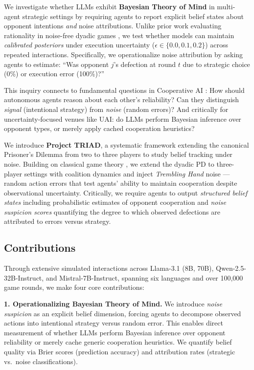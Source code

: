 \documentclass{uai2026} %
\begin{document}
We investigate whether LLMs exhibit \textbf{Bayesian Theory of Mind} in multi-agent strategic settings by requiring agents to report explicit belief states about opponent intentions \textit{and} noise attributions. Unlike prior work evaluating rationality in noise-free dyadic games \citep{akata2023playing,horton2023large}, we test whether models can maintain \textit{calibrated posteriors} under execution uncertainty ($\epsilon \in \{0.0, 0.1, 0.2\}$) across repeated interactions. Specifically, we operationalize noise attribution by asking agents to estimate: ``Was opponent $j$'s defection at round $t$ due to strategic choice (0\%) or execution error (100\%)?''

This inquiry connects to fundamental questions in Cooperative AI \citep{dafoe2020open}: How should autonomous agents reason about each other's reliability? Can they distinguish \textit{signal} (intentional strategy) from \textit{noise} (random errors)? And critically for uncertainty-focused venues like UAI: do LLMs perform Bayesian inference over opponent types, or merely apply cached cooperation heuristics?

We introduce \textbf{Project TRIAD}, a systematic framework extending the canonical Prisoner's Dilemma from two to three players to study belief tracking under noise. Building on classical game theory \citep{neumann1944theory,axelrod1981evolution}, we extend the dyadic PD to three-player settings with coalition dynamics and inject \textit{Trembling Hand} noise \citep{selten1975reexamination}---random action errors that test agents' ability to maintain cooperation despite observational uncertainty. Critically, we require agents to output \textit{structured belief states} including probabilistic estimates of opponent cooperation and \textit{noise suspicion scores} quantifying the degree to which observed defections are attributed to errors versus strategy.

\subsection{Contributions}

Through extensive simulated interactions across Llama-3.1 (8B, 70B), Qwen-2.5-32B-Instruct, and Mistral-7B-Instruct, spanning six languages and over 100,000 game rounds, we make four core contributions:

\textbf{1. Operationalizing Bayesian Theory of Mind.} We introduce \textit{noise suspicion} as an explicit belief dimension, forcing agents to decompose observed actions into intentional strategy versus random error. This enables direct measurement of whether LLMs perform Bayesian inference over opponent reliability or merely cache generic cooperation heuristics. We quantify belief quality via Brier scores (prediction accuracy) and attribution rates (strategic vs.~noise classifications).
\end{document}
